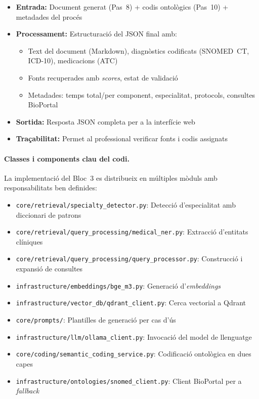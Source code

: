 \documentclass[CAT]{TFUOC}%
\begin{document}
\begin{itemize}
    \setlength{\itemsep}{0.3em}
    \item \textbf{Entrada:} Document generat (Pas~8) + codis ontològics (Pas~10) + metadades del procés
    \item \textbf{Processament:} Estructuració del JSON final amb:
    \begin{itemize}
        \item Text del document (Markdown), diagnòstics codificats (SNOMED~CT, ICD-10), medicacions (ATC)
        \item Fonts recuperades amb \textit{scores}, estat de validació
        \item Metadades: temps total/per component, especialitat, protocols, consultes BioPortal
    \end{itemize}
    \item \textbf{Sortida:} Resposta JSON completa per a la interfície web
    \item \textbf{Traçabilitat:} Permet al professional verificar fonts i codis assignats
\end{itemize}

\paragraph{Classes i components clau del codi.}

La implementació del Bloc~3 es distribueix en múltiples mòduls amb responsabilitats ben definides:

\begin{itemize}
    \item \texttt{core/retrieval/specialty\_detector.py}: Detecció d'especialitat amb diccionari de patrons
    \item \texttt{core/retrieval/query\_processing/medical\_ner.py}: Extracció d'entitats clíniques
    \item \texttt{core/retrieval/query\_processing/query\_processor.py}: Construcció i expansió de consultes
    \item \texttt{infrastructure/embeddings/bge\_m3.py}: Generació d'\textit{embeddings}
    \item \texttt{infrastructure/vector\_db/qdrant\_client.py}: Cerca vectorial a Qdrant
    \item \texttt{core/prompts/}: Plantilles de generació per cas d'ús
    \item \texttt{infrastructure/llm/ollama\_client.py}: Invocació del model de llenguatge
    \item \texttt{core/coding/semantic\_coding\_service.py}: Codificació ontològica en dues capes
    \item \texttt{infrastructure/ontologies/snomed\_client.py}: Client BioPortal per a \textit{fallback}
\end{itemize}
\end{document}
